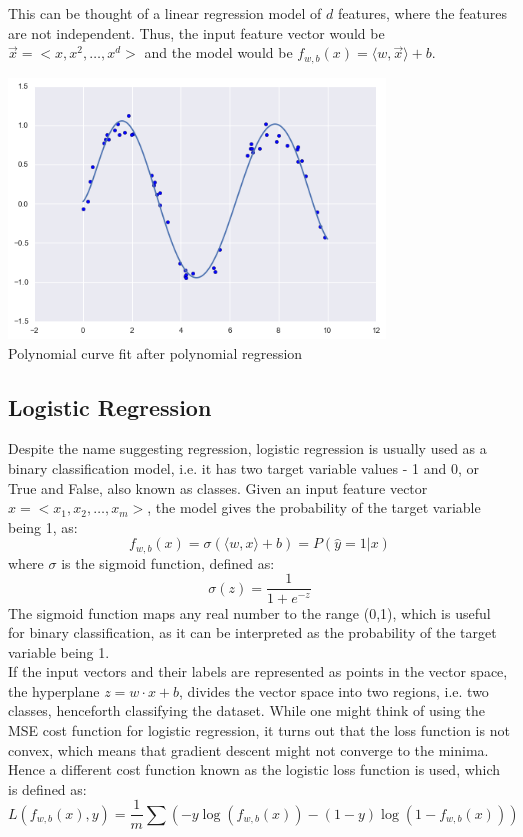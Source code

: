 \documentclass[12pt]{article}
\newcommand{\innerproduct}[2]{\langle#1, #2 \rangle}
\begin{document}
This can be thought of a linear regression model of $d$ features, where the features are not independent. Thus, the input feature vector would be $\vec{x}=<x,x^2,\dots,x^d>$ and the model would be $f_{w,b}(x) = \innerproduct{w}{\vec{x}} + b$.\\
\begin{center}
    \includegraphics*[width=10cm]{poly-reg.png}\\
    Polynomial curve fit after polynomial regression
\end{center}

\subsection{Logistic Regression}
Despite the name suggesting regression, logistic regression is usually used as a binary classification model, i.e. it has two target variable values - 1 and 0, or True and False, also known as classes. 
Given an input feature vector $x = <x_1,x_2,\dots,x_m>$, the model gives the probability of the target variable being 1, as:
\begin{equation}
    f_{w,b}(x) = \sigma(\innerproduct{w}{x} + b) = P(\hat{y}=1|x)
\end{equation}
where $\sigma$ is the sigmoid function, defined as:
\begin{equation}
    \sigma(z) = \frac{1}{1+e^{-z}}
\end{equation}
The sigmoid function maps any real number to the range (0,1), which is useful for binary classification, as it can be interpreted as the probability of the target variable being 1.\\
\newline
If the input vectors and their labels are represented as points in the vector space, the hyperplane $z = w \cdot x + b$, divides the vector space into two regions, i.e. two classes, henceforth classifying the dataset.
\newline
While one might think of using the MSE cost function for logistic regression, it turns out that the loss function is not convex, which means that gradient descent might not converge to the minima. Hence a different cost function known as the logistic loss function is used, which is defined as:
\begin{equation}
    L(f_{w,b}(x),y) = \frac{1}{m} \sum(-y \log(f_{w,b}(x)) - (1-y) \log(1-f_{w,b}(x)))
\end{equation}
\end{document}
